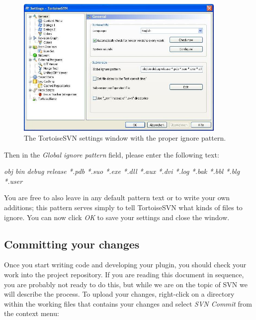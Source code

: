 \begin{figure}[h!]
	\centering
		\includegraphics[width=0.90\textwidth]{figures/tortoise_svn_ignore_patterns.jpg}
	\caption{The TortoiseSVN settings window with the proper ignore pattern.}
	\label{fig:tortoise_svn_ignore_patterns}
\end{figure}

\noindent Then in the \textit{Global ignore pattern} field, please enter the following text:

\begin{center}
\textit{obj bin debug release *.pdb *.suo *.exe *.dll *.aux *.dvi *.log *.bak *.bbl *.blg *.user}
\end{center}

You are free to also leave in any default pattern text or to write your own additions; this pattern serves simply to tell TortoiseSVN what kinds of files to ignore. You can now click \textit{OK} to save your settings and close the window.
\clearpage

\subsection{Committing your changes}
\label{CommitingYourChanges}

Once you start writing code and developing your plugin, you should check your work into the project repository. If you are reading this document in sequence, you are probably not ready to do this, but while we are on the topic of SVN we will describe the process. To upload your changes, right-click on a directory within the working files that contains your changes and select \textit{SVN Commit} from the context menu:

